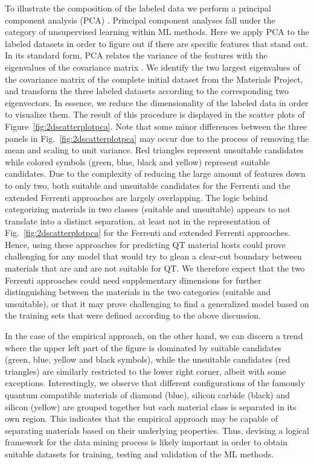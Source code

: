 \documentclass[superscriptaddress,unsortedaddress,
 amsmath,amssymb,
 aps,
]{revtex4-2}
\begin{document}
To illustrate the composition of the labeled data we perform a principal component analysis (PCA) \cite{Jolliffe2002}. Principal component analyses fall  under the category of unsupervised learning within ML  methods. Here we apply PCA to the labeled datasets in order to figure out if there are specific features that stand out. In its standard  form, PCA relates the variance of the features with the eigenvalues of the covariance matrix \cite{Jolliffe2002,Murphy2012,Hastie2009}. We identify the two largest eigenvalues of the covariance matrix \cite{Hastie2009} of the complete initial dataset from the Materials Project, and transform the three labeled datasets according to the corresponding two eigenvectors. In essence, we reduce the dimensionality of the labeled data in order to visualize them.
The result of this procedure is displayed in the scatter plots of Figure~\ref{fig:2dscatterplotpca}. Note that some minor differences between the three panels in Fig.~\ref{fig:2dscatterplotpca} may occur due to the process of removing the mean and scaling to unit variance. Red triangles represent unsuitable candidates while colored symbols (green, blue, black and yellow) represent suitable candidates. 
Due to the complexity of reducing the large amount of features down to only two, both suitable and unsuitable candidates for the Ferrenti and the extended Ferrenti approaches are largely overlapping. 
The logic behind categorizing materials in two classes (suitable and unsuitable) appears to not translate into a distinct separation, at least not in the representation of Fig.~\ref{fig:2dscatterplotpca} for the Ferrenti and extended Ferrenti approaches.  
Hence, using these approaches for predicting QT material hosts could prove challenging for any model that would try to glean a clear-cut boundary between materials that are and are not suitable for QT. 
We therefore expect that the two Ferrenti approaches could need supplementary dimensions for further distinguishing between the materials in the two categories (suitable and unsuitable), or that it may prove challenging to find a generalized model based on the training sets that were defined according to the above discussion. 

In the case of the empirical approach, on the other hand, we can discern a trend where the upper left part of the figure is dominated by suitable candidates (green, blue, yellow and black symbols), while the unsuitable candidates (red triangles) are similarly restricted to the lower right corner, albeit with some exceptions. 
Interestingly, we observe that different configurations of the famously quantum compatible materials of diamond (blue), silicon carbide (black) and silicon (yellow) are grouped together but each material class is separated in its own region. 
This indicates that the empirical approach may be capable of separating materials based on their underlying properties. Thus, devising a logical framework for the data mining process is likely important in order to obtain suitable datasets for training, testing and validation of the ML methods. 
\end{document}
